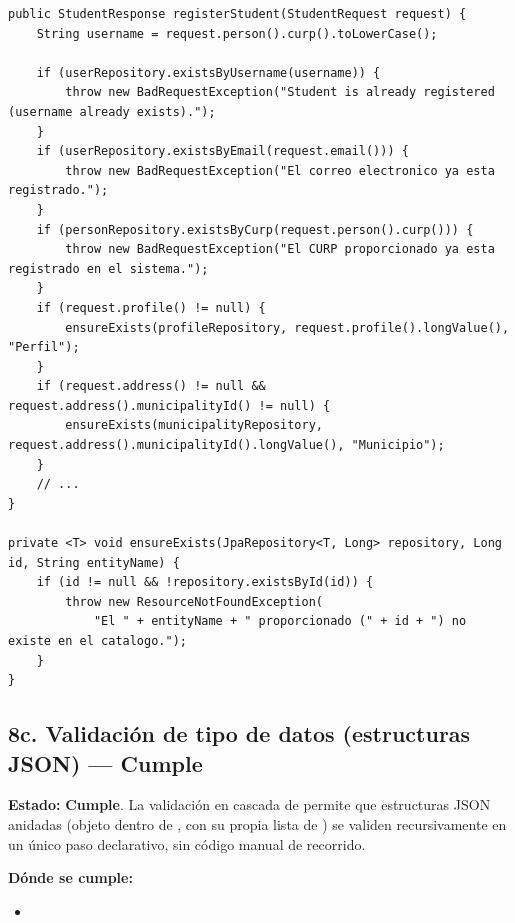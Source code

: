 \documentclass[11pt,a4paper]{article}
\newcommand{\Cumple}{\textcolor{cumpleColor}{\textbf{Cumple}}}
\begin{document}
\begin{lstlisting}[style=javastyle,caption={Reglas de negocio de registro de estudiante (UserServiceImpl.java)}]
public StudentResponse registerStudent(StudentRequest request) {
    String username = request.person().curp().toLowerCase();

    if (userRepository.existsByUsername(username)) {
        throw new BadRequestException("Student is already registered (username already exists).");
    }
    if (userRepository.existsByEmail(request.email())) {
        throw new BadRequestException("El correo electronico ya esta registrado.");
    }
    if (personRepository.existsByCurp(request.person().curp())) {
        throw new BadRequestException("El CURP proporcionado ya esta registrado en el sistema.");
    }
    if (request.profile() != null) {
        ensureExists(profileRepository, request.profile().longValue(), "Perfil");
    }
    if (request.address() != null && request.address().municipalityId() != null) {
        ensureExists(municipalityRepository, request.address().municipalityId().longValue(), "Municipio");
    }
    // ...
}

private <T> void ensureExists(JpaRepository<T, Long> repository, Long id, String entityName) {
    if (id != null && !repository.existsById(id)) {
        throw new ResourceNotFoundException(
            "El " + entityName + " proporcionado (" + id + ") no existe en el catalogo.");
    }
}
\end{lstlisting}

\subsection{8c. Validación de tipo de datos (estructuras JSON) --- \Cumple}

\textbf{Estado:} \Cumple. La validación en cascada de \texttt{} permite que estructuras JSON anidadas (objeto \texttt{} dentro de \texttt{}, con su propia lista de \texttt{}) se validen recursivamente en un único paso declarativo, sin código manual de recorrido.

\textbf{Dónde se cumple:}
\begin{itemize}[leftmargin=1.2cm,nosep]
\item \texttt{}
\end{itemize}
\end{document}
